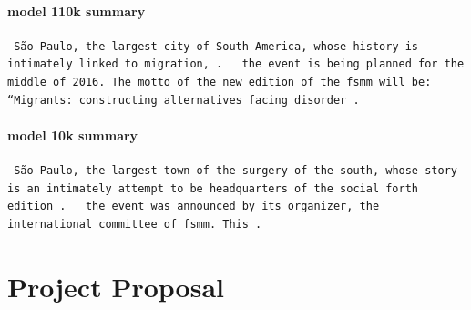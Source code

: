 \documentclass[12pt,a4paper,twoside,openright]{report}
\begin{document}
\subsubsection{model 110k summary}
\begin{lstlisting}
 São Paulo, the largest city of South America, whose history is intimately linked to migration, .   the event is being planned for the middle of 2016. The motto of the new edition of the fsmm will be: “Migrants: constructing alternatives facing disorder .

\end{lstlisting}
\subsubsection{model 10k summary}
\begin{lstlisting}
 São Paulo, the largest town of the surgery of the south, whose story is an intimately attempt to be headquarters of the social forth edition .   the event was announced by its organizer, the international committee of fsmm. This .

\end{lstlisting}


\chapter{Project Proposal}



\end{document}
